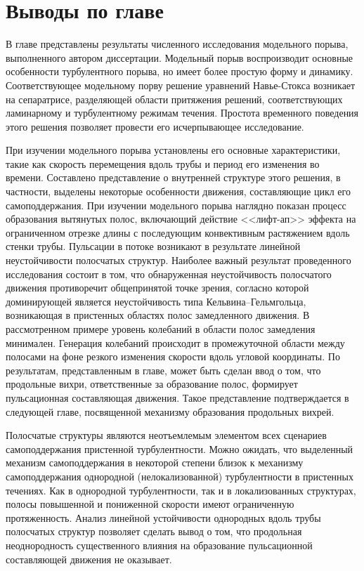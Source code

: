 \section{Выводы по главе}

В главе представлены результаты численного исследования модельного порыва, выполненного автором диссертации. Модельный порыв воспроизводит основные особенности турбулентного порыва, но имеет более простую форму и динамику. Соответствующее модельному порву решение уравнений Навье-Стокса возникает на сепаратрисе, разделяющей области притяжения решений, соответствующих ламинарному и турбулентному режимам течения. Простота временного поведения этого решения позволяет провести его исчерпывающее исследование. 

При изучении модельного порыва установлены его основные характеристики, такие как скорость перемещения вдоль трубы и период его изменения во времени. Составлено представление о внутренней структуре этого решения, в частности, выделены некоторые особенности движения, составляющие цикл его самоподдержания. При изучении модельного порыва наглядно показан процесс образования вытянутых полос, включающий действие <<лифт-ап>> эффекта на ограниченном отрезке длины с последующим конвективным растяжением вдоль стенки трубы. Пульсации в потоке возникают в результате линейной неустойчивости полосчатых структур. Наиболее важный результат проведенного исследования состоит в том, что обнаруженная неустойчивость полосчатого движения противоречит общепринятой точке зрения, согласно которой доминирующей является неустойчивость типа Кельвина--Гельмгольца, возникающая в пристенных областях полос замедленного движения. В рассмотренном примере уровень колебаний в области полос замедления минимален. Генерация колебаний происходит в промежуточной области между полосами на фоне резкого изменения скорости вдоль угловой координаты. По результатам, представленным в главе, может быть сделан ввод о том, что продольные вихри, ответственные за образование полос, формирует пульсационная составляющая движения. Такое представление подтверждается в следующей главе, посвященной механизму образования продольных вихрей.

Полосчатые структуры являются неотъемлемым элементом всех сценариев самоподдержания пристенной турбулентности. Можно ожидать, что выделенный механизм самоподдержания в некоторой степени близок к механизму самоподдержания однородной (нелокализованной) турбулентности в пристенных течениях. Как в однородной турбулентности, так и в локализованных структурах, полосы повышенной и пониженной скорости имеют ограниченную протяженность. Анализ линейной устойчивости однородных вдоль трубы полосчатых структур позволяет сделать вывод о том, что продольная неоднородность существенного влияния на образование пульсационной составляющей движения не оказывает.

